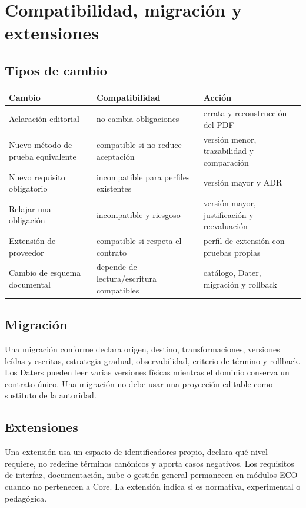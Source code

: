\documentclass[11pt,letterpaper]{article}
\begin{document}
\section{Compatibilidad, migración y extensiones}
\subsection{Tipos de cambio}
\begin{longtable}{p{.22\linewidth}p{.33\linewidth}p{.37\linewidth}}
\toprule Cambio & Compatibilidad & Acción \\ \midrule
Aclaración editorial & no cambia obligaciones & errata y reconstrucción del PDF \\
Nuevo método de prueba equivalente & compatible si no reduce aceptación & versión menor, trazabilidad y comparación \\
Nuevo requisito obligatorio & incompatible para perfiles existentes & versión mayor y ADR \\
Relajar una obligación & incompatible y riesgoso & versión mayor, justificación y reevaluación \\
Extensión de proveedor & compatible si respeta el contrato & perfil de extensión con pruebas propias \\
Cambio de esquema documental & depende de lectura/escritura compatibles & catálogo, Dater, migración y rollback \\ \bottomrule
\end{longtable}

\subsection{Migración}
Una migración conforme declara origen, destino, transformaciones, versiones leídas y
escritas, estrategia gradual, observabilidad, criterio de término y rollback. Los Daters
pueden leer varias versiones físicas mientras el dominio conserva un contrato único. Una
migración no debe usar una proyección editable como sustituto de la autoridad.

\subsection{Extensiones}
Una extensión usa un espacio de identificadores propio, declara qué nivel requiere, no
redefine términos canónicos y aporta casos negativos. Los requisitos de interfaz,
documentación, nube o gestión general permanecen en módulos ECO cuando no pertenecen a
Core. La extensión indica si es normativa, experimental o pedagógica.
\end{document}
